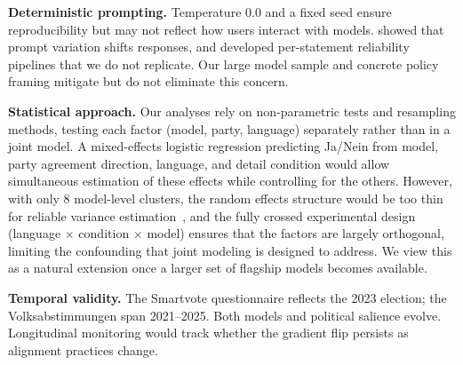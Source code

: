 \documentclass[11pt]{article}
\begin{document}
\textbf{Deterministic prompting.}
Temperature 0.0 and a fixed seed ensure reproducibility but may not reflect how users interact with models.
\citet{rottger2024political} showed that prompt variation shifts responses, and \citet{ceron2024beyond} developed per-statement reliability pipelines that we do not replicate.
Our large model sample and concrete policy framing mitigate but do not eliminate this concern.

\textbf{Statistical approach.}
Our analyses rely on non-parametric tests and resampling methods, testing each factor (model, party, language) separately rather than in a joint model.
A mixed-effects logistic regression predicting Ja/Nein from model, party agreement direction, language, and detail condition would allow simultaneous estimation of these effects while controlling for the others.
However, with only 8 model-level clusters, the random effects structure would be too thin for reliable variance estimation~\citep{bolker2009generalized}, and the fully crossed experimental design (language $\times$ condition $\times$ model) ensures that the factors are largely orthogonal, limiting the confounding that joint modeling is designed to address.
We view this as a natural extension once a larger set of flagship models becomes available.

\textbf{Temporal validity.}
The Smartvote questionnaire reflects the 2023 election; the Volksabstimmungen span 2021--2025.
Both models and political salience evolve.
Longitudinal monitoring would track whether the gradient flip persists as alignment practices change.
\end{document}
